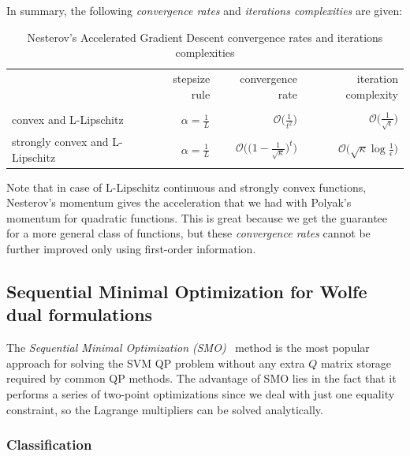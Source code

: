 
In summary, the following \emph{convergence rates} and \emph{iterations complexities} are given:

\begin{table}[H]
\centering
\caption{Nesterov's Accelerated Gradient Descent convergence rates and iterations complexities}
\label{nesterov_gradient_rates}
\begin{tabular}{lrrr}
\toprule
	& stepsize rule & convergence rate & iteration complexity \\
 	& 		& 		& 		\\
\midrule
convex and L-Lipschitz & $\displaystyle \alpha = \frac{1}{L}$ & $\displaystyle \mathcal{O}\Bigg(\frac{1}{t^2}\Bigg)$ & $\displaystyle \mathcal{O}\Bigg(\frac{1}{\sqrt{\epsilon}}\Bigg)$ \\
strongly convex and L-Lipschitz & $\displaystyle \alpha = \frac{1}{L}$ & $\displaystyle \mathcal{O}\Bigg(\Bigg(1 - \frac{1}{\sqrt{\kappa}}\Bigg)^t\Bigg)$ & $\displaystyle \mathcal{O}\Bigg(\sqrt{\kappa}\log \frac{1}{\epsilon}\Bigg)$ \\
\bottomrule
\end{tabular}
\end{table}

Note that in case of L-Lipschitz continuous and strongly convex functions, Nesterov's momentum gives the acceleration that we had with Polyak’s momentum for quadratic functions. This is great because we get the guarantee for a more general class of functions, but these \emph{convergence rates} cannot be further improved only using first-order information.

\pagebreak

\subsection{Sequential Minimal Optimization for Wolfe dual formulations}

The \emph{Sequential Minimal Optimization (SMO)}~\cite{platt1998sequential} method is the most popular approach for solving the SVM QP problem without any extra $Q$ matrix storage required by common QP methods. The advantage of SMO lies in the fact that it performs a series of two-point optimizations since we deal with just one equality constraint, so the Lagrange multipliers can be solved analytically.

\subsubsection{Classification}

